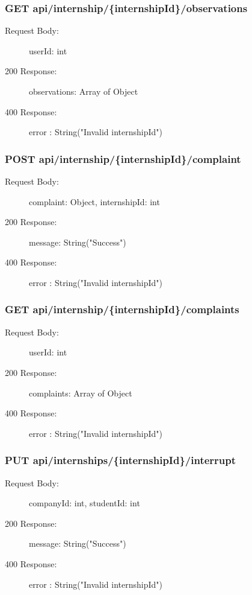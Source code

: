 \documentclass[a4paper,12pt]{article}
\begin{document}
\subsubsection*{GET api/internship/\{internshipId\}/observations}
\begin{description}
    \item[Request Body:] userId: int
    \item[200 Response:] observations: Array of Object 
    \item[400 Response:] error : String("Invalid internshipId")
\end{description}

\subsubsection*{POST api/internship/\{internshipId\}/complaint}
\begin{description}
    \item[Request Body:] complaint: Object, internshipId: int
    \item[200 Response:] message: String("Success") 
    \item[400 Response:] error : String("Invalid internshipId")
\end{description}
\subsubsection*{GET api/internship/\{internshipId\}/complaints}
\begin{description}
    \item[Request Body:] userId: int
    \item[200 Response:] complaints: Array of Object
    \item[400 Response:] error : String("Invalid internshipId")
\end{description}

\subsubsection*{PUT api/internships/\{internshipId\}/interrupt}
\begin{description}
    \item[Request Body:] companyId: int, studentId: int
    \item[200 Response:] message: String("Success") 
    \item[400 Response:] error : String("Invalid internshipId")
\end{description}
\end{document}
